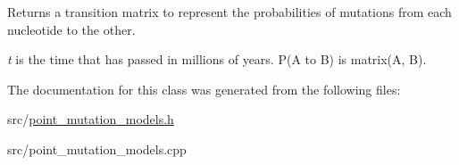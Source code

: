 Returns a transition matrix to represent the probabilities of mutations from each nucleotide to the other. 

{\itshape t} is the time that has passed in millions of years. P(\+A to B) is matrix(\+A, B). 

The documentation for this class was generated from the following files\+:\begin{DoxyCompactItemize}
\item 
src/\mbox{\hyperlink{point__mutation__models_8h}{point\+\_\+mutation\+\_\+models.\+h}}\item 
src/point\+\_\+mutation\+\_\+models.\+cpp\end{DoxyCompactItemize}
